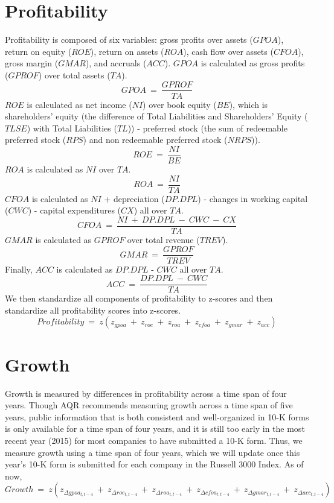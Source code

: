 \documentclass[12pt]{article}
\begin{document}

\section*{Profitability}
Profitability is composed of six variables: gross profits over assets ($GPOA$), return on equity ($ROE$), return on assets ($ROA$), cash flow over assets ($CFOA$), gross margin ($GMAR$), and accruals ($ACC$). $GPOA$ is calculated as gross profits ($GPROF$) over total assets ($TA$). $$GPOA \ = \ \frac{GPROF}{TA}$$ $ROE$ is calculated as net income ($NI$) over book equity ($BE$), which is shareholders' equity (the difference of Total Liabilities and Shareholders' Equity ($TLSE$) with Total Liabilities ($TL$)) - preferred stock (the sum of redeemable preferred stock ($RPS$) and non redeemable preferred stock ($NRPS$)). $$ROE \ = \ \frac{NI}{BE}$$ $ROA$ is calculated as $NI$ over $TA$. $$ROA \ = \ \frac{NI}{TA}$$ $CFOA$ is calculated as $NI$ + depreciation ($DP.DPL$) - changes in working capital ($CWC$) - capital expenditures ($CX$) all over $TA$. $$CFOA \ = \ \frac{NI \ + \ DP.DPL \ - \ CWC \ - \ CX}{TA}$$ $GMAR$ is calculated as $GPROF$ over total revenue ($TREV$). $$GMAR \ = \ \frac{GPROF}{TREV}$$ Finally, $ACC$ is calculated as $DP.DPL$ - $CWC$ all over $TA$. $$ACC \ = \ \frac{DP.DPL \ - \ CWC}{TA}$$ We then standardize all components of profitability to z-scores and then standardize all profitability scores into z-scores. $$Profitability \ = \ z(z_{gpoa} \ + \ z_{roe} \ + \ z_{roa} \ + \ z_{cfoa} \ + \ z_{gmar} \ + \ z_{acc})$$
\section*{Growth}
Growth is measured by differences in profitability across a time span of four years. Though AQR recommends measuring growth across a time span of five years, public information that is both consistent and well-organized in 10-K forms is only available for a time span of four years, and it is still too early in the most recent year (2015) for most companies to have submitted a 10-K form. Thus, we measure growth using a time span of four years, which we will update once this year's 10-K form is submitted for each company in the Russell 3000 Index. As of now, $$Growth \ = \ z(z_{\Delta gpoa_{t,t-4}} \ + \ z_{\Delta roe_{t,t-4}} \ + \ z_{\Delta roa_{t,t-4}} \ + \ z_{\Delta cfoa_{t,t-4}} \ + \ z_{\Delta gmar_{t,t-4}} \ + \ z_{\Delta acc_{t,t-4}})$$
\end{document}
